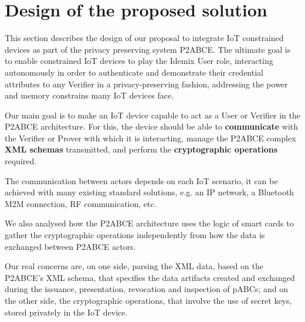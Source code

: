 
\section{Design of the proposed solution}\label{ch:design}

This section describes the design of our proposal to integrate IoT constrained devices as part of the privacy preserving system P2ABCE. The ultimate goal is to enable constrained IoT devices to play the Idemix User role, interacting autonomously in order to authenticate and demonstrate their credential attributes to any Verifier in a privacy-preserving fashion, addressing the power and memory constrains many IoT devices face.



Our main goal is to make an IoT device capable to act as a User or Verifier in the P2ABCE architecture. For this, the device should be able to \textbf{communicate} with the Verifier or Prover with which it is interacting, manage the P2ABCE complex \textbf{XML schemas} transmitted, and perform the \textbf{cryptographic operations} required.

The communication between actors depends on each IoT scenario, it can be achieved with many existing standard solutions, e.g. an IP network, a Bluetooth M2M connection, RF communication, etc.

We also analysed how the P2ABCE architecture uses the logic of smart cards to gather the cryptographic operations independently from how the data is exchanged between P2ABCE actors.

Our real concerns are, on one side, parsing the XML data, based on the P2ABCE's XML schema, that specifies the data artifacts created and exchanged during the issuance, presentation, revocation and inspection of pABCs; and on the other side, the cryptographic operations, that involve the use of secret keys, stored privately in the IoT device.


